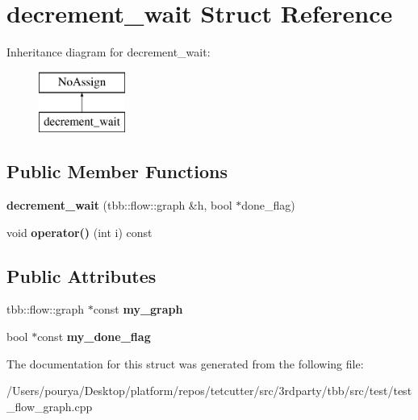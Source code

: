 \hypertarget{structdecrement__wait}{}\section{decrement\+\_\+wait Struct Reference}
\label{structdecrement__wait}
Inheritance diagram for decrement\+\_\+wait\+:\begin{figure}[H]
\begin{center}
\leavevmode
\includegraphics[height=2.000000cm]{structdecrement__wait}
\end{center}
\end{figure}
\subsection*{Public Member Functions}
\begin{DoxyCompactItemize}
\item 
\hypertarget{structdecrement__wait_a0f21b27d4f9a2df424418af90be1064a}{}{\bfseries decrement\+\_\+wait} (tbb\+::flow\+::graph \&h, bool $\ast$done\+\_\+flag)\label{structdecrement__wait_a0f21b27d4f9a2df424418af90be1064a}

\item 
\hypertarget{structdecrement__wait_ac7a14d3d323a68acbe2d0fe376f5c332}{}void {\bfseries operator()} (int i) const \label{structdecrement__wait_ac7a14d3d323a68acbe2d0fe376f5c332}

\end{DoxyCompactItemize}
\subsection*{Public Attributes}
\begin{DoxyCompactItemize}
\item 
\hypertarget{structdecrement__wait_a443345d00c809a8dae664e53c2cad749}{}tbb\+::flow\+::graph $\ast$const {\bfseries my\+\_\+graph}\label{structdecrement__wait_a443345d00c809a8dae664e53c2cad749}

\item 
\hypertarget{structdecrement__wait_a177f330d325f24e1a0c7b4ccab5532d9}{}bool $\ast$const {\bfseries my\+\_\+done\+\_\+flag}\label{structdecrement__wait_a177f330d325f24e1a0c7b4ccab5532d9}

\end{DoxyCompactItemize}


The documentation for this struct was generated from the following file\+:\begin{DoxyCompactItemize}
\item 
/\+Users/pourya/\+Desktop/platform/repos/tetcutter/src/3rdparty/tbb/src/test/test\+\_\+flow\+\_\+graph.\+cpp\end{DoxyCompactItemize}
